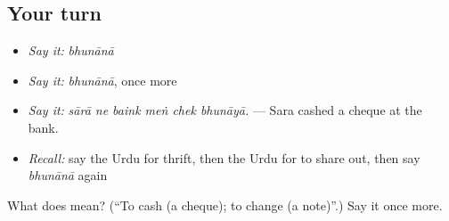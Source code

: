 \subsection*{Your turn}
\begin{itemize}
\raggedright
  \item \emph{Say it:} \emph{bhunānā}
  \item \emph{Say it:} \emph{bhunānā}, once more
  \item \emph{Say it:} \emph{sārā ne baink meṅ chek bhunāyā.} — Sara cashed a cheque at the bank.
  \item \emph{Recall:} say the Urdu for thrift, then the Urdu for to share out, then say \emph{bhunānā} again
\end{itemize}

\begin{tcolorbox}[breakable,colback=teal!4,colframe=teal!35!black,title={Before you move on}]
What does  mean? (\textquotedblleft{}To cash (a cheque); to change (a note)\textquotedblright{}.) Say it once more.
\end{tcolorbox}
